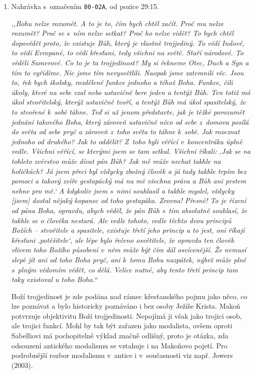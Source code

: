 \begin{enumerate}

\item{%
Nahrávka s~označením \texttt{80-02A}, od pozice 29:15.

\textit{%
,,Bohu nelze rozumět. A to je to, čím bych chtěl začít. Proč mu nelze rozumět?
Proč se s~ním
nelze setkat? Proč ho nelze vidět? To bych chtěl dopovědět proto, že existuje
Bůh,
který je vlastně trojjediný. To vědí Indové, to vědí Evropané, to vědí křesťani,
tedy všichni na světě. Staří národové. To věděli Sumerové. Co to je ta
trojjedinost? My si řekneme Otec, Duch a Syn a tím to
vyřídíme. Nic jsme tím nevysvětlili. Naopak jsme zatemnili věc. Jsou to, řek bych
školsky, rozdělené funkce jednoho a téhož Boha. Funkce, čili úkoly, které na sebe
vzal nebo ustavičně bere jeden a tentýž Bůh. Ten totiž má úkol stvořitelský,
kterýž ustavičně tvoří, a tentýž Bůh má úkol spasitelský, že to stvořené k~sobě
táhne. Teď si už jenom představte, jak je těžké porozumět jednání takového Boha,
který zároveň ustavičně něco od sebe z~domova posílá do světa od sebe pryč a zároveň
z~toho světa to táhne k~sobě. Jak rozeznat jednoho od druhého? Jak to oddělit?
Z~toho byli věřící
v~koncentráku úplně vedle. Všichni věřící, se kterými jsem se tam setkal.
Všichni říkali: ,Jak se
na tohleto zvěrstvo může dívat pán Bůh? Jak mě může nechat takhle na holičkách?
Já
jsem přeci byl vždycky zbožný člověk a já tady takhle trpím bez pomoci a takový
zvíře gestapácký má na mě všechna práva a Bůh ani prstem nehne pro mě.` A kdykoliv
jsem s~nimi souhlasil a takhle myslel, vždycky [jsem] dostal nějaký kopanec od
toho gestapáka. Zrovna! Přesně! To je řízení od pána Boha, opravdu, abych věděl, že
pán Bůh s~tím absolutně souhlasí, že takhle se o člověka nestará. Ale vedle
tohoto,
vedle těchto dvou principů Božích -- stvořitele a spasitele, existuje třetí jeho princip a
to jest, oni říkají křesťani ,potěšitele`, ale lépe bylo řečeno osvětitele, že
opravdu ten člověk vlivem toho Božího působení v~něm může být čím dál
osvícenější. Že nemusí slepě jít ani od toho Boha pryč, ani k~tomu Bohu
nazpátek,
nýbrž může plně s~plným vědomím vědět, co dělá. Velice nutné, aby tento třetí
princip tam taky existoval u toho Boha.``
}

Boží trojjedinost je zde podána nad rámec křesťanského pojmu jako něco, co lze
poznávat a bylo historicky poznáváno i bez osoby Ježíše Krista. Makoň potvrzuje
objektivitu Boží trojjedinosti. Nepojímá ji však jako trojici osob, ale trojici
        funkcí. Mohl by tak být zařazen jako modalista, ovšem oproti
        Sabelliovi\cite{lyman2013sabellius} má
pochopitelně výklad značně odlišný, proto je otázka, zda odsouzení antického
        modalismu se vztahuje i na Makoňovo pojetí. Pro podrobnější rozbor modalismu v~antice i
v~současnosti viz např. Jowers (2003).\cite{jowers2003reproach}

}
\end{enumerate}
